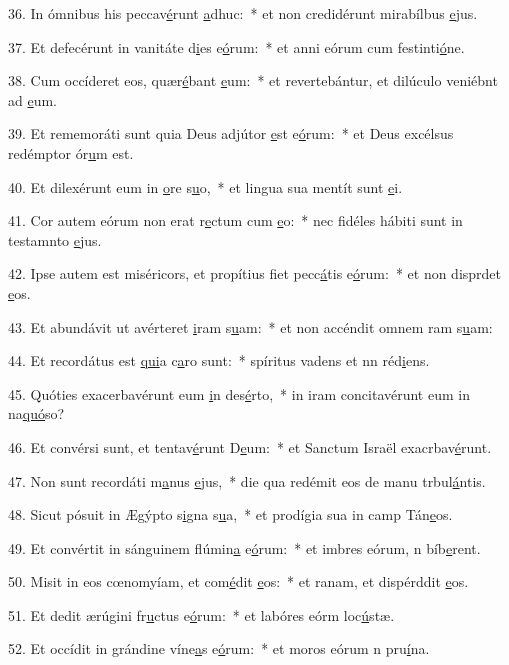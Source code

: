 36. In ómnibus his peccav\uline{é}runt \uline{a}dhuc:~* et non credidérunt mirabílbus \uline{e}jus.\par 
37. Et defecérunt in vanitáte d\uline{i}es e\uline{ó}rum:~* et anni eórum cum festinti\uline{ó}ne.\par 
38. Cum occíderet eos, quær\uline{é}bant \uline{e}um:~* et revertebántur, et dilúculo veniébnt ad \uline{e}um.\par 
39. Et rememoráti sunt quia Deus adjútor \uline{e}st e\uline{ó}rum:~* et Deus excélsus redémptor ór\uline{u}m est.\par 
40. Et dilexérunt eum in \uline{o}re s\uline{u}o,~* et lingua sua mentít sunt \uline{e}i.\par 
41. Cor autem eórum non erat r\uline{e}ctum cum \uline{e}o:~* nec fidéles hábiti sunt in testamnto \uline{e}jus.\par 
42. Ipse autem est miséricors, et propítius fiet pecc\uline{á}tis e\uline{ó}rum:~* et non disprdet \uline{e}os.\par 
43. Et abundávit ut avérteret \uline{i}ram s\uline{u}am:~* et non accéndit omnem ram s\uline{u}am:\par 
44. Et recordátus est \uline{qui}a c\uline{a}ro sunt:~* spíritus vadens et nn réd\uline{i}ens.\par 
45. Quóties exacerbavérunt eum \uline{i}n des\uline{é}rto,~* in iram concitavérunt eum in na\uline{quó}so?\par 
46. Et convérsi sunt, et tentav\uline{é}runt D\uline{e}um:~* et Sanctum Israël exacrbav\uline{é}runt.\par 
47. Non sunt recordáti m\uline{a}nus \uline{e}jus,~* die qua redémit eos de manu trbul\uline{á}ntis.\par 
48. Sicut pósuit in Ægýpto s\uline{i}gna s\uline{u}a,~* et prodígia sua in camp Tán\uline{e}os.\par 
49. Et convértit in sánguinem flúmin\uline{a} e\uline{ó}rum:~* et imbres eórum, n bíb\uline{e}rent.\par 
50. Misit in eos cœnomyíam, et com\uline{é}dit \uline{e}os:~* et ranam, et dispérddit \uline{e}os.\par 
51. Et dedit ærúgini fr\uline{u}ctus e\uline{ó}rum:~* et labóres eórm loc\uline{ú}stæ.\par 
52. Et occídit in grándine víne\uline{a}s e\uline{ó}rum:~* et moros eórum n pru\uline{í}na.\par 
